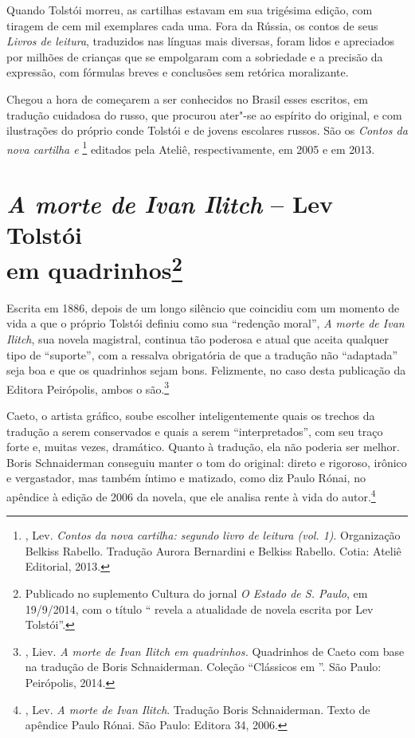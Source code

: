 Quando Tolstói morreu, as cartilhas estavam em sua trigésima
edição, com tiragem de cem mil exemplares cada uma. Fora da
Rússia, os contos de seus \emph{Livros de leitura}, traduzidos
nas línguas mais diversas, foram lidos e apreciados por milhões
de crianças que se empolgaram com a sobriedade e a precisão da
expressão, com fórmulas breves e conclusões sem retórica
moralizante.

Chegou a hora de começarem a ser conhecidos no Brasil esses
escritos, em tradução cuidadosa do russo, que procurou ater"-se
ao espírito do original, e com ilustrações do próprio conde
Tolstói e de jovens escolares russos. São os \emph{Contos da
nova cartilha  e }\footnote{, Lev. \emph{Contos da nova cartilha: segundo livro de leitura (vol. 1)}. Organização Belkiss Rabello. Tradução Aurora Bernardini e Belkiss Rabello. Cotia: Ateliê Editorial, 2013.} editados pela
Ateliê, respectivamente, em 2005 e em 2013.



\chapter{\emph{A morte de Ivan Ilitch} -- Lev Tolstói\\ em quadrinhos\footnote{Publicado no suplemento Cultura do jornal \emph{O Estado de S. Paulo}, em 19/9/2014, com o título ``\protect{} revela a atualidade de novela escrita por Lev Tolstói''.}}
\label{ivan}

Escrita em 1886, depois de um longo silêncio que coincidiu
com um momento de vida a que o próprio Tolstói definiu como
sua ``redenção moral'', \emph{A morte de Ivan Ilitch}, sua
novela magistral, continua tão poderosa e atual que aceita
qualquer tipo de ``suporte'', com a ressalva obrigatória de que
a tradução não ``adaptada'' seja boa e que os quadrinhos sejam
bons. Felizmente, no caso desta publicação da Editora Peirópolis,
ambos o são.\footnote{, Liev. \emph{A morte de
Ivan Ilitch em quadrinhos.} Quadrinhos de Caeto com base na
tradução de Boris Schnaiderman. Coleção ``Clássicos em
''. São Paulo: Peirópolis, 2014.} 

Caeto, o artista gráfico, soube escolher inteligentemente quais os
trechos da tradução a serem conservados e quais a serem ``interpretados'', com seu traço forte e, muitas vezes, dramático.
Quanto à tradução, ela não poderia ser melhor. Boris Schnaiderman
conseguiu manter o tom do original: direto e rigoroso, irônico e
vergastador, mas também íntimo e matizado, como diz Paulo Rónai,
no apêndice à edição de 2006 da novela, que ele analisa rente à
vida do autor.\footnote{, Lev. \emph{A morte de
Ivan Ilitch}. Tradução Boris Schnaiderman. Texto de apêndice
Paulo Rónai. São Paulo: Editora 34, 2006.}

